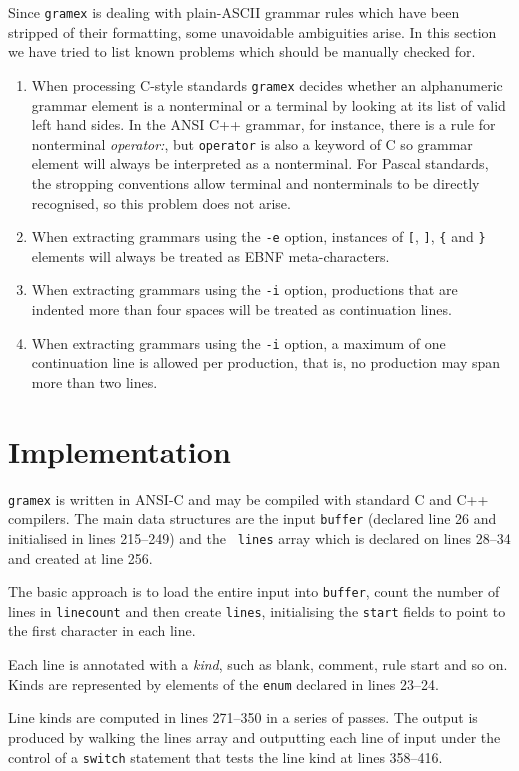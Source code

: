 \documentclass[11pt]{article}
\newcommand{\lt}{\tt}
\begin{document}
Since {\lt gramex} is dealing with plain-ASCII grammar rules which
have been stripped of their formatting, some unavoidable ambiguities
arise. In this section we have tried to list known problems which
should be manually checked for.
\begin{enumerate}
\item When processing C-style standards
{\lt gramex} decides whether an alphanumeric grammar element is
a nonterminal or a terminal by looking at its list of valid left hand
sides. In the ANSI C++ grammar, for instance, there is a rule for
nonterminal {\em operator:}, but {\tt operator} is also a keyword of
C so grammar element  will always be interpreted as a
nonterminal. For Pascal standards, the stropping conventions allow
terminal and nonterminals to be directly recognised, so this problem
does not arise.

\item When extracting grammars using the {\tt -e} option, instances of
\verb+[+, \verb+]+, \verb+{+ and \verb+}+ elements will always be
treated as EBNF meta-characters.

\item When extracting grammars using the {\tt -i} option, productions
that are indented more than four spaces will be treated as
continuation lines.

\item When extracting grammars using the {\tt -i} option, a maximum of
one continuation line is allowed per production, that is, no
production may span more than two lines.
\end{enumerate}


\section{Implementation}
{\lt gramex} is written in ANSI-C and may be compiled with standard C
and C++ compilers. The main data structures are the input {\tt buffer}
(declared line 26 and initialised in lines 215--249) and the {\tt
lines} array which is declared on lines 28--34 and created at line
256.

The basic approach is to load the entire input
into {\tt buffer}, count the number of lines in {\tt linecount} and
then create {\tt lines}, initialising the {\tt start} fields to point
to the first character in each line.

Each line is annotated with a {\em kind}, such as blank, comment, rule
start and so on. Kinds are represented by elements of the {\tt enum}
declared in lines 23--24.

Line kinds are computed in lines 271--350 in a series of passes. The
output is produced by walking the lines array and outputting each line
of input under the control of a {\tt switch} statement that tests the
line kind at lines 358--416.

{\footnotesize
{}
}


\end{document}
